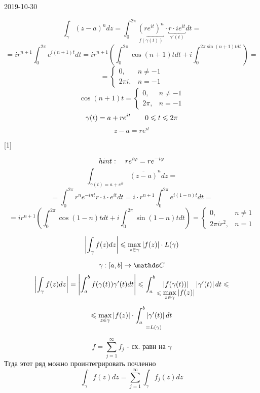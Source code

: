 \documentclass[main]{subfiles}
\begin{document}
\begin{lect}{2019-10-30}
     \begin{Example}[1]
         \[\int_\gamma (z - a)^n dz = \int_0^{2\pi} \underbracket{(re^{it} )^n
         }_{f(\gamma(t))} \cdot \underbracket{r \cdot ie^{it} }_{\gamma'(t)} dt = \]
         \[=ir^{n + 1} \int_0^{2\pi}e^{i(n + 1)t}dt = ir^{n + 1} (\int_0^{2\pi}
         \cos(n + 1)tdt + i\int_0^{2\pi \sin(n + 1)tdt} ) =   \]
         \[= \begin{cases}
             0,  & n \neq -1\\
             2\pi i, & n = -1
         \end{cases}\]
         \[\cos(n + 1)t = \begin{cases}
             0, & n \neq -1\\
             2\pi, & n = -1
         \end{cases}\]
         \[\gamma(t) = a + re^{it} \qquad 0 \leqslant t \leqslant 2\pi \]
         \[z - a = re^{it} \]
     \end{Example}[1]

     \begin{Example}[2]
         \[hint: \quad r e^{i\varphi} = r e^{-i \varphi}  \]
         \[\int_{\gamma(t) = a + e^{it} } \overline{(z - a)}^n dz =  \]
         \[=\int_0^{2\pi} r^n e^{-int} r \cdot i \cdot e^{it}dt =
         i \cdot r^{n + 1}  \int_0^{2\pi} e^{i(1 - n)t}dt =  \]
         \[=ir^{n + 1} \left(\int_0^{2\pi} \cos(1 - n)tdt + i\int_0^{2\pi}
         \sin(1 - n)tdt\right) = \begin{cases}
             0, & n \neq 1\\
             2\pi i r^2, & n = 1
         \end{cases}\]
     \end{Example}

     \begin{Utv}
         \[\left|\int_\gamma f(z)dz\right| \leqslant \max_{z \in \gamma} \left|f(z)\right| \cdot L(\gamma)\]
     \end{Utv}

     \begin{Proof}
         \[\gamma : [a, b] \to \CC\]
         \[\left|\int_\gamma f(z)dz\right| = \left|\int_a^b f(\gamma(t)) \gamma'(t)dt\right| \leqslant
         \int_a^b \underset{\leqslant \displaystyle \max_{z \in \gamma}
     \left|f(z)\right|}{\left|f(\gamma(t))\right| }\left|\gamma'(t)\right|dt \leqslant \]
     \[\leqslant \max_{z \in \gamma} \left|f(z)\right| \cdot \underset{= L(\gamma)}{\int_a^b \left|\gamma'(t)\right|dt }\]
     \end{Proof}

     \begin{Consequence}
         \[f = \sum_{j = 1}^\infty f_j \text{ - сх. равн на } \gamma \]
         Тгда этот ряд можно проинтегрировать почленно
         \[\int_\gamma f(z)dz = \sum_{j = 1}^\infty \int_\gamma f_j(z)dz\]
     \end{Consequence}


\end{lect}
\end{document}
